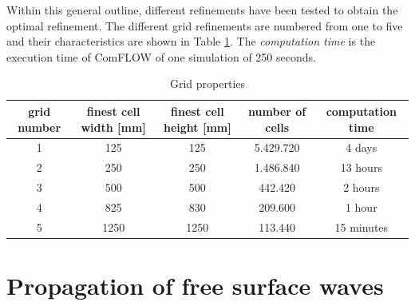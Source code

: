 Within this general outline, different refinements have been tested to obtain the optimal refinement. The different grid refinements are numbered from one to five and their characteristics are shown in Table \ref{tab:celldimensions}. The \textit{computation time} is the execution time of ComFLOW of one simulation of 250 seconds.

\begin{table}[H]
\centering
    \begin{tabular}{@{}ccccc@{}}
    \toprule
    grid number & finest cell width {[}mm{]} & finest cell height {[}mm{]} & number of cells & computation time \\ \midrule
    1           & 125                 & 125                  & 5.429.720 & 4 days \\
    2           & 250                 & 250                  & 1.486.840 & 13 hours \\
    3           & 500                 & 500                  & 442.420 & 2 hours \\
    4           & 825                 & 830                  & 209.600 & 1 hour \\ 
    5           & 1250                 & 1250                & 113.440 & 15 minutes  \\ \bottomrule
    \end{tabular}
    \caption{Grid properties}
    \label{tab:celldimensions}
\end{table}




\section{Propagation of free surface waves}
\label{sec: prop of free surface waves}


